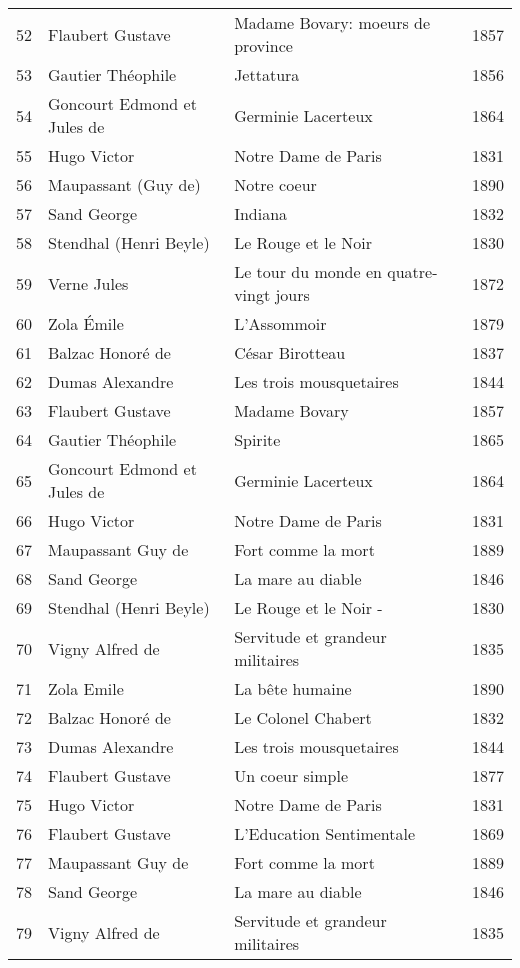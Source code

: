 \begin{center}
\begin{small}
\begin{longtable}{l l l l}
  52 & Flaubert Gustave & Madame Bovary: moeurs de province & 1857 \\
  53 & Gautier Théophile & Jettatura & 1856 \\
  54 & Goncourt Edmond et Jules de & Germinie Lacerteux & 1864 \\
  55 & Hugo Victor & Notre Dame de Paris & 1831 \\
  56 & Maupassant (Guy de) & Notre coeur & 1890 \\
  57 & Sand George & Indiana & 1832 \\
  58 & Stendhal (Henri Beyle) & Le Rouge et le Noir & 1830 \\
  59 & Verne Jules & Le tour du monde en quatre-vingt jours & 1872 \\
  60 & Zola Émile & L’Assommoir & 1879 \\
  61 & Balzac Honoré de & César Birotteau & 1837 \\
  62 & Dumas Alexandre & Les trois mousquetaires & 1844 \\
  63 & Flaubert Gustave & Madame Bovary & 1857 \\
  64 & Gautier Théophile & Spirite & 1865 \\
  65 & Goncourt Edmond et Jules de & Germinie Lacerteux & 1864 \\
  66 & Hugo Victor & Notre Dame de Paris & 1831 \\
  67 & Maupassant Guy de & Fort comme la mort & 1889 \\
  68 & Sand George & La mare au diable & 1846 \\
  69 & Stendhal (Henri Beyle) & Le Rouge et le Noir - & 1830 \\
  70 & Vigny Alfred de & Servitude et grandeur militaires & 1835 \\
  71 & Zola Emile & La bête humaine & 1890 \\
  72 & Balzac Honoré de & Le Colonel Chabert & 1832 \\
  73 & Dumas Alexandre & Les trois mousquetaires & 1844 \\
  74 & Flaubert Gustave & Un coeur simple & 1877 \\
  75 & Hugo Victor & Notre Dame de Paris & 1831 \\
  76 & Flaubert Gustave & L'Education Sentimentale & 1869 \\
  77 & Maupassant Guy de & Fort comme la mort & 1889 \\
  78 & Sand George & La mare au diable & 1846 \\
  79 & Vigny Alfred de & Servitude et grandeur militaires & 1835 \\

\end{longtable}
\end{small}
\end{center}

